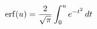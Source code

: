 \documentclass[preview]{standalone}
\begin{document}
\begin{align*}
\special{dvisvgm:raw <g id='unique000'>}\operatorname{erf}(u)=\frac2{\sqrt\pi}\int_0^u e^{-t^2}\,dt\special{dvisvgm:raw </g>}
\end{align*}
\end{document}
